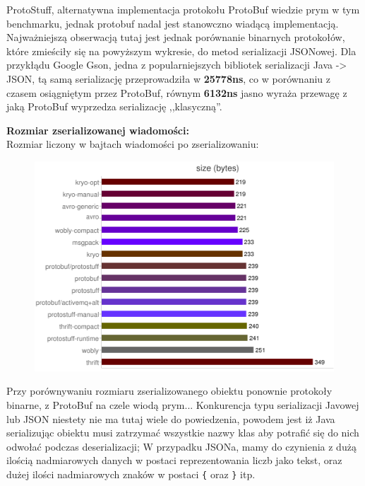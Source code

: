ProtoStuff, alternatywna implementacja protokołu ProtoBuf wiedzie prym w tym benchmarku, jednak protobuf nadal jest stanowczno wiadącą implementacją.
Najważniejszą obserwacją tutaj jest jednak porównanie binarnych protokołów, które zmieściły się na powyższym wykresie, do metod serializacji JSONowej.
Dla przykłądu Google Gson, jedna z popularniejszych bibliotek serializacji Java -> JSON, tą samą serializację przeprowadziła w \textbf{25778ns}, co w porównaniu
z czasem osiągniętym przez ProtoBuf, równym \textbf{6132ns} jasno wyraża przewagę z jaką ProtoBuf wyprzedza serializację ,,klasyczną''.

\newpage
\textbf{Rozmiar zserializowanej wiadomości:}\\
Rozmiar liczony w bajtach wiadomości po zserializowaniu:

\begin{figure}[ch!]
\includegraphics[width=\textwidth]{serialized_size_1}
\end{figure}

Przy porównywaniu rozmiaru zserializowanego obiektu ponownie protokoły binarne, z ProtoBuf na czele wiodą prym... 
Konkurencja typu serializacji Javowej lub JSON niestety nie ma tutaj wiele do powiedzenia, powodem jest iż Java serializując obiektu musi
zatrzymać wszystkie nazwy klas aby potrafić się do nich odwołać podczas deserializacji; W przypadku JSONa, mamy do czynienia z dużą ilością nadmiarowych danych
w postaci reprezentowania liczb jako tekst, oraz dużej ilości nadmiarowych znaków w postaci \verb|{| oraz \verb|}| itp.



\newpage
